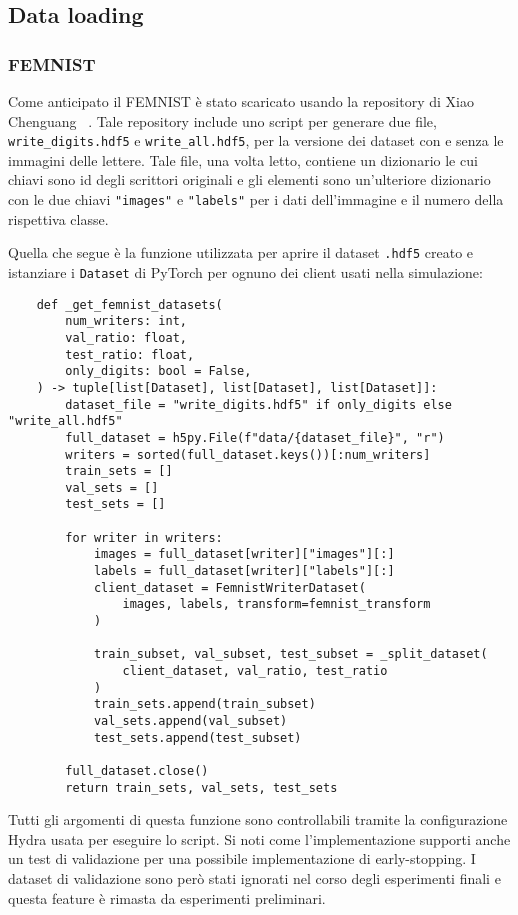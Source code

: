 \subsection{Data loading}
\subsubsection{FEMNIST}
Come anticipato il FEMNIST è stato scaricato usando la repository di 
Xiao Chenguang ~\cite{femnist_hdf5}. Tale repository include uno script 
per generare due file, \texttt{write\_digits.hdf5} e \texttt{write\_all.hdf5},
per la versione dei dataset con e senza le immagini delle lettere.
Tale file, una volta letto, contiene un dizionario le cui chiavi sono 
id degli scrittori originali e gli elementi sono un'ulteriore dizionario 
con le due chiavi \texttt{"images"} e \texttt{"labels"} per i dati 
dell'immagine e il numero della rispettiva classe.

Quella che segue è la funzione
utilizzata per aprire il dataset \texttt{.hdf5} creato 
e istanziare i \texttt{Dataset} di PyTorch per ognuno dei client usati nella
simulazione:
\clearpage
\begin{lstlisting}
    def _get_femnist_datasets(
        num_writers: int,
        val_ratio: float,
        test_ratio: float,
        only_digits: bool = False,
    ) -> tuple[list[Dataset], list[Dataset], list[Dataset]]:    
        dataset_file = "write_digits.hdf5" if only_digits else "write_all.hdf5"
        full_dataset = h5py.File(f"data/{dataset_file}", "r")
        writers = sorted(full_dataset.keys())[:num_writers]
        train_sets = []
        val_sets = []
        test_sets = []
    
        for writer in writers:
            images = full_dataset[writer]["images"][:]
            labels = full_dataset[writer]["labels"][:]
            client_dataset = FemnistWriterDataset(
                images, labels, transform=femnist_transform
            )
    
            train_subset, val_subset, test_subset = _split_dataset(
                client_dataset, val_ratio, test_ratio
            )
            train_sets.append(train_subset)
            val_sets.append(val_subset)
            test_sets.append(test_subset)
    
        full_dataset.close()
        return train_sets, val_sets, test_sets
\end{lstlisting}
Tutti gli argomenti di questa funzione sono controllabili tramite la
configurazione Hydra usata per eseguire lo script. Si noti come
l'implementazione supporti anche un test di validazione per una 
possibile implementazione di early-stopping. I dataset di validazione 
sono però stati ignorati nel corso degli esperimenti finali e questa feature 
è rimasta da esperimenti preliminari.

